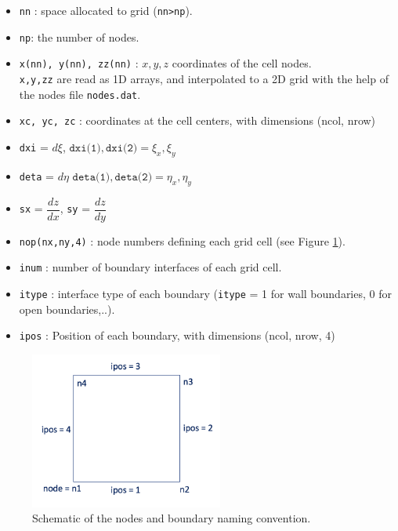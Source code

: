 \documentclass{article}
\newcommand{\code}[1]{\texttt{#1}}
\begin{document}
\begin{itemize}
	\item \code{nn} : space allocated to grid (\code{nn>np}).
	\item  \code{np}:  the number of nodes. 
	\item \code{x(nn), y(nn), zz(nn)} : $x,y,z$ coordinates of the cell nodes.  \\[0.1cm]
		\code{x,y,zz} are read as 1D arrays, and interpolated to a 2D grid with the help of the nodes file \code{nodes.dat}.
		\item  \code{xc, yc, zc} : coordinates at the cell centers, with dimensions (ncol, nrow)
		
	\item  \code{dxi} = $d\xi$, \quad  $\code{dxi(1)},\code{dxi(2)} =   \xi_x, \xi_y $
	\item  \code{deta} =  $d\eta$ \quad  $\code{deta(1)},\code{deta(2)} =   \eta_x, \eta_y $

	\item \code{sx} = $\dfrac{dz}{dx}$,  \code{sy} =  $\dfrac{dz}{dy}$
	\item \code{nop(nx,ny,4)} : node numbers defining each grid cell (see Figure \ref{nodes}).  

	\item \code{inum} : number of boundary interfaces of each grid cell.
	\item \code{itype} :  interface type of each boundary (\code{itype} = 1 for wall boundaries, 0 for open boundaries,..).  
	\item \code{ipos} :  Position of each boundary, with dimensions (ncol, nrow, 4)
\end{itemize}


 \begin{figure}[h]
 \centering
\includegraphics[width=15pc]{grid/boundaries.png}
 \caption{Schematic of the nodes and boundary naming convention. }
 \label{nodes}
 \end{figure}
 
\end{document}
